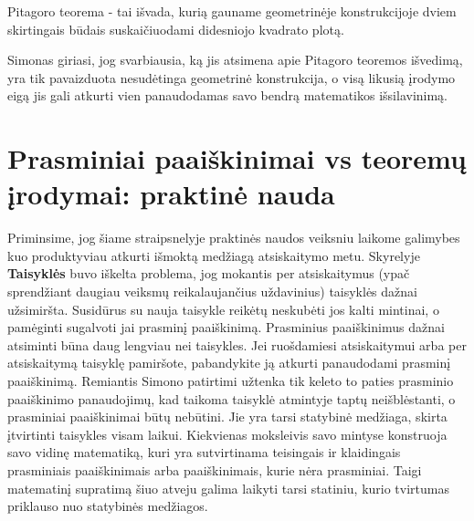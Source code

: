 \documentclass{article}
\begin{document}
\begin{mdframed}[backgroundcolor=yellow!50!white]
Pitagoro teorema - tai išvada, kurią gauname geometrinėje konstrukcijoje  dviem skirtingais būdais suskaičiuodami didesniojo kvadrato plotą.
\end{mdframed}

Simonas giriasi, jog svarbiausia, ką jis atsimena apie Pitagoro teoremos išvedimą, yra tik pavaizduota nesudėtinga geometrinė konstrukcija, o visą likusią įrodymo eigą jis gali atkurti vien panaudodamas savo bendrą matematikos išsilavinimą.

\section*{Prasminiai paaiškinimai vs teoremų įrodymai: praktinė nauda}

Priminsime, jog šiame straipsnelyje praktinės naudos veiksniu laikome galimybes kuo produktyviau atkurti išmoktą medžiagą atsiskaitymo metu. Skyrelyje \textbf{Taisyklės} buvo iškelta problema, jog mokantis per atsiskaitymus (ypač sprendžiant daugiau veiksmų reikalaujančius uždavinius) taisyklės dažnai užsimiršta. Susidūrus su nauja taisykle reikėtų neskubėti jos kalti mintinai, o pamėginti sugalvoti jai prasminį paaiškinimą. Prasminius paaiškinimus dažnai atsiminti būna daug lengviau nei taisykles. Jei ruošdamiesi atsiskaitymui arba per atsiskaitymą taisyklę pamiršote, pabandykite ją atkurti panaudodami prasminį paaiškinimą. Remiantis Simono patirtimi užtenka tik keleto to paties prasminio paaiškinimo panaudojimų, kad taikoma taisyklė atmintyje taptų neišblėstanti, o prasminiai paaiškinimai būtų nebūtini. Jie yra tarsi statybinė medžiaga, skirta įtvirtinti taisykles visam laikui. Kiekvienas moksleivis savo mintyse konstruoja savo vidinę matematiką, kuri yra sutvirtinama teisingais ir klaidingais prasminiais paaiškinimais arba paaiškinimais, kurie nėra prasminiai. Taigi matematinį supratimą šiuo atveju galima laikyti tarsi statiniu, kurio tvirtumas priklauso nuo statybinės medžiagos.
\end{document}
